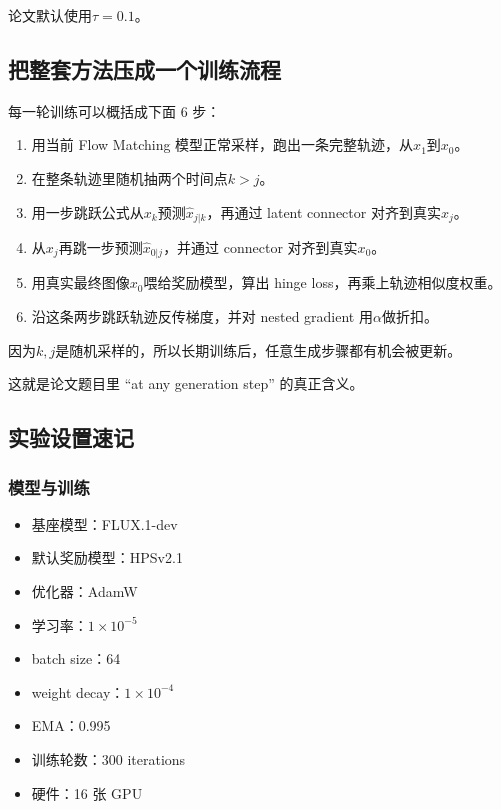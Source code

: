 论文默认使用$\tau = 0.1$。

\subsection{把整套方法压成一个训练流程}

每一轮训练可以概括成下面 6 步：

\begin{enumerate}[leftmargin=1.5em]
  \item 用当前 Flow Matching 模型正常采样，跑出一条完整轨迹，从$x_1$到$x_0$。
  \item 在整条轨迹里随机抽两个时间点$k > j$。
  \item 用一步跳跃公式从$x_k$预测$\hat{x}_{j|k}$，再通过 latent connector 对齐到真实$x_j$。
  \item 从$x_j$再跳一步预测$\hat{x}_{0|j}$，并通过 connector 对齐到真实$x_0$。
  \item 用真实最终图像$x_0$喂给奖励模型，算出 hinge loss，再乘上轨迹相似度权重。
  \item 沿这条两步跳跃轨迹反传梯度，并对 nested gradient 用$\alpha$做折扣。
\end{enumerate}

因为$k, j$是随机采样的，所以长期训练后，任意生成步骤都有机会被更新。

这就是论文题目里 “at any generation step” 的真正含义。

\subsection{实验设置速记}

\subsubsection{模型与训练}

\begin{itemize}[leftmargin=1.5em]
  \item 基座模型：FLUX.1-dev
  \item 默认奖励模型：HPSv2.1
  \item 优化器：AdamW
  \item 学习率：$1\times10^{-5}$
  \item batch size：64
  \item weight decay：$1\times10^{-4}$
  \item EMA：0.995
  \item 训练轮数：300 iterations
  \item 硬件：16 张 GPU
\end{itemize}

